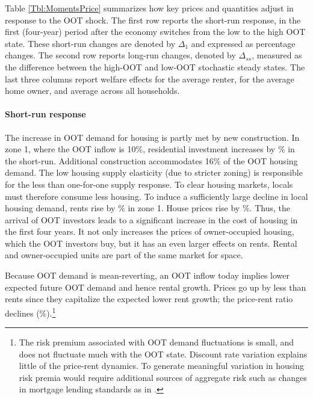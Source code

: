 \documentclass[letterpaper,12pt,dvipsnames,usenames]{article}
\theoremstyle{definition}
\begin{document}
\begin{spacing}{1.25}
Table \ref{Tbl:MomentsPrice} summarizes how key prices and quantities adjust in response to the OOT shock.  The first row  reports the short-run response,  in the first (four-year) period after the economy switches from the low to the high OOT state. These short-run changes are denoted by $\Delta_1$  and expressed as percentage changes. The second row reports long-run changes, denoted by $\Delta_{ss}$, measured as the difference between the high-OOT and low-OOT stochastic steady states.  The last three columns report welfare effects for the average renter, for the average home owner, and average across all households.

\paragraph{Short-run response}
The increase in OOT demand for housing is partly met by new construction. In zone 1, where the OOT inflow is 10\%, residential investment increases by {}\% in the short-run. Additional construction accommodates 16\% of the OOT housing demand. The low housing supply elasticity (due to stricter zoning) is responsible for the less than one-for-one supply response. To clear housing markets, locals must therefore consume less housing. To induce a sufficiently large decline in local housing demand, rents rise by {}\% in zone 1. House prices rise by {}\%. Thus, the arrival of OOT investors leads to a significant increase in the cost of housing in the first four years. It not only increases the prices of owner-occupied housing, which the OOT investors buy, but it has an even larger effects on rents. Rental and owner-occupied units are part of the same market for space.

Because OOT demand  is mean-reverting, an OOT inflow today implies lower expected future OOT demand and hence rental growth. Prices go up by less than rents since they capitalize the expected lower rent growth; the price-rent ratio declines ({}\%).\footnote{The risk premium associated with OOT demand fluctuations is small, and does not fluctuate much with the OOT state. Discount rate variation explains little of the price-rent dynamics. To generate meaningful variation in housing risk premia would require additional sources of aggregate risk such as changes in mortgage lending standards as in \citet{favilukis/ludvigson/nieuwerburgh:09}.}


\end{spacing}
\end{document}

